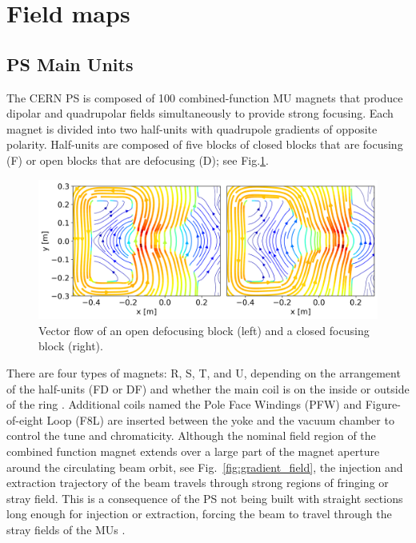 \documentclass[a4paper,
               biblatex,     %
               keeplastbox,   %
               ]{jacow}
\begin{document}
\section{Field maps}
\subsection{PS Main Units}
The CERN PS is composed of 100 combined-function MU magnets that produce dipolar and quadrupolar fields simultaneously to provide strong focusing. Each magnet is divided into two half-units with quadrupole gradients of opposite polarity. Half-units are composed of five blocks of closed blocks that are focusing (F) or open blocks that are defocusing (D); see Fig.\ref{fig:streamplot}.

\begin{figure}[!htb]
   \centering
   \includegraphics*[width=1.0\columnwidth]{streamplot_defocusing_focusing.png}
   \caption{Vector flow of an open defocusing block (left) and a closed focusing block (right).}
   \label{fig:streamplot}
\end{figure}

There are four types of magnets: R, S, T, and U, depending on the arrangement of the half-units (FD or DF) and whether the main coil is on the inside or outside of the ring \cite{steerenberg_fifty_2011}. Additional coils named the Pole Face Windings (PFW) and Figure-of-eight Loop (F8L) are inserted between the yoke and the vacuum chamber to control the tune and chromaticity. Although the nominal field region of the combined function magnet extends over a large part of the magnet aperture around the circulating beam orbit, see Fig.~\ref{fig:gradient_field}, the injection and extraction trajectory of the beam travels through strong regions of fringing or stray field. This is a consequence of the PS not being built with straight sections long enough for injection or extraction, forcing the beam to travel through the stray fields of the MUs \cite{risselada_beam_nodate}.
\end{document}
